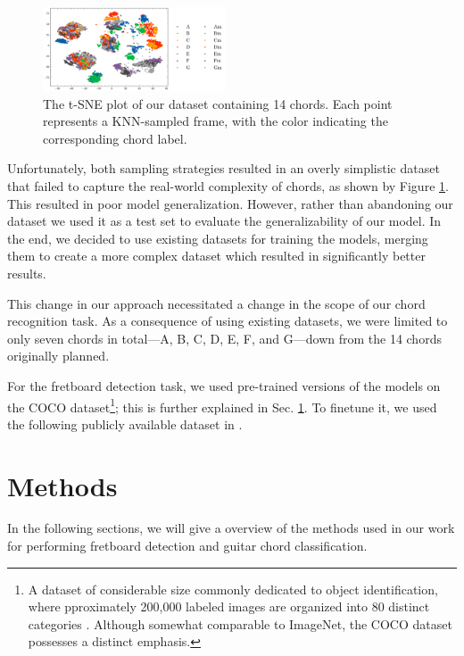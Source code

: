 \documentclass[10pt,twocolumn,letterpaper]{article}
\begin{document}
\begin{figure}[h]
    \centering
    \includegraphics[width=0.48\textwidth]{images/final/Guitar-chords-ours_t-sne_plot.png}
    \caption{The t-SNE plot of our dataset containing 14 chords. Each point represents a KNN-sampled frame, with the color indicating the corresponding chord label.}
    \label{fig:ours-tsne-plot}
\end{figure}

Unfortunately, both sampling strategies resulted in an overly simplistic dataset that failed to capture the real-world complexity of chords, as shown by Figure \ref{fig:ours-tsne-plot}. This resulted in poor model generalization. However, rather than abandoning our dataset we used it as a test set to evaluate the generalizability of our model. In the end, we decided to use existing datasets \cite{guitar-chord-tvon8_dataset,guitar-chord-bounding-box_dataset, guitar-chord-handshape_dataset, guitar-chords-daewp_dataset} for training the models, merging them to create a more complex dataset which resulted in significantly better results.

This change in our approach necessitated a change in the scope of our chord recognition task. As a consequence of using existing datasets, we were limited to only seven chords in total—A, B, C, D, E, F, and G—down from the 14 chords originally planned.

For the fretboard detection task, we used pre-trained versions of the models on the COCO dataset\footnote{A dataset of considerable size commonly dedicated to object identification, where pproximately 200,000 labeled images are organized into 80 distinct categories \cite{lin2015microsoftcococommonobjects}. Although somewhat comparable to ImageNet, the COCO dataset possesses a distinct emphasis.}; this is further explained in Sec. \ref{sec:methods}. To finetune it, we used the following publicly available dataset in \cite{guitar-necks-detector}.

\section{Methods}\label{sec:methods}
In the following sections, we will give a overview of the methods used in our work for performing fretboard detection and guitar chord classification.
\end{document}
